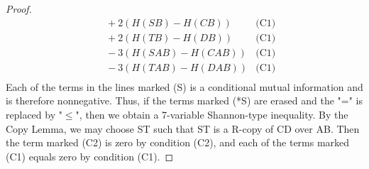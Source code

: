 \documentclass[10pt,journal]{IEEEtran}
\begin{document}
\begin{proof}
\begin{align*}
      &\ \   + 2(H(SB)-H(CB))                                                    & \text{(C1)} \\
      &\ \   + 2(H(TB)-H(DB))                                                    & \text{(C1)} \\
      &\ \   - 3(H(SAB)-H(CAB))                                                  & \text{(C1)} \\
      &\ \   - 3(H(TAB)-H(DAB))                                                  & \text{(C1)} \\
\end{align*}
Each of the terms in the lines marked (S) is a conditional mutual
information and is therefore nonnegative.  Thus, if the terms marked (*S)
are erased and the "=" is replaced by "$\leq$", then we obtain a 7-variable
Shannon-type inequality.  By the Copy Lemma, we may choose ST such
that ST is a R-copy of CD over AB.  Then the term marked (C2) is zero
by condition (C2), and each of the terms marked (C1) equals zero
by condition (C1).


\end{proof}
\end{document}
